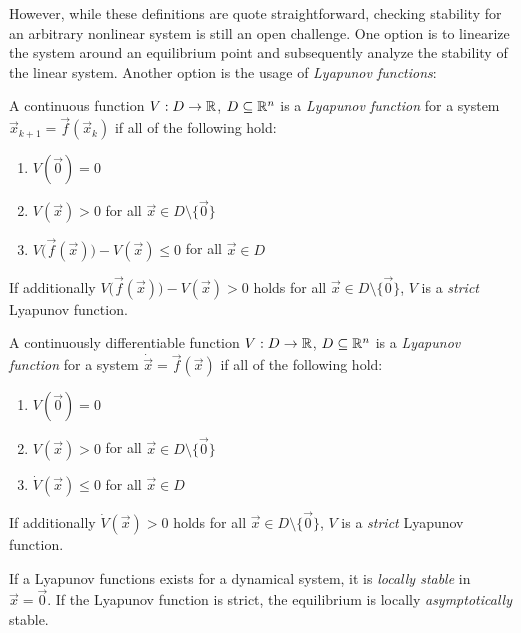 				However, while these definitions are quote straightforward, checking stability for an arbitrary nonlinear system is still an open challenge. One option is to linearize the system around an equilibrium point and subsequently analyze the stability of the linear system. Another option is the usage of \emph{Lyapunov functions}:
				\begin{definition}
					A continuous function \( V : D \to \mathbb{R} \), \( D \subseteq \mathbb{R}^n \) is a \emph{Lyapunov function} for a system \( \vec{x}_{k + 1} = \vec{f}(\vec{x}_k) \) if all of the following hold:
					\begin{enumerate}
						\item \( V(\vec{0}) = 0 \)
						\item \( V(\vec{x}) > 0 \) for all \( \vec{x} \in D \setminus \{ \vec{0} \} \)
						\item \( V\bigl( \vec{f}(\vec{x}) \bigr) - V(\vec{x}) \leq 0 \) for all \( \vec{x} \in D \)
					\end{enumerate}
					If additionally \( V\bigl( \vec{f}(\vec{x}) \bigr) - V(\vec{x}) > 0 \) holds for all \( \vec{x} \in D \setminus \{ \vec{0} \} \), \(V\) is a \emph{strict} Lyapunov function.
				\end{definition}
				\begin{definition}
					A continuously differentiable function \( V : D \to \mathbb{R} \), \( D \subseteq \mathbb{R}^n \) is a \emph{Lyapunov function} for a system \( \dot{\vec{x}} = \vec{f}(\vec{x}) \) if all of the following hold:
					\begin{enumerate}
						\item \( V(\vec{0}) = 0 \)
						\item \( V(\vec{x}) > 0 \) for all \( \vec{x} \in D \setminus \{ \vec{0} \} \)
						\item \( \dot{V}(\vec{x}) \leq 0 \) for all \( \vec{x} \in D \)
					\end{enumerate}
					If additionally \( \dot{V}(\vec{x}) > 0 \) holds for all \( \vec{x} \in D \setminus \{ \vec{0} \} \), \(V\) is a \emph{strict} Lyapunov function.
				\end{definition}
				\begin{theorem}
					If a Lyapunov functions exists for a dynamical system, it is \emph{locally stable} in \( \vec{x} = \vec{0} \). If the Lyapunov function is strict, the equilibrium is locally \emph{asymptotically} stable.
				\end{theorem}

